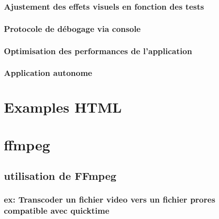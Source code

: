 \documentclass[
]{book}
\begin{document}
\hypertarget{ajustement-des-effets-visuels-en-fonction-des-tests}{%
\subsection{Ajustement des effets visuels en fonction des tests}\label{ajustement-des-effets-visuels-en-fonction-des-tests}}

\hypertarget{protocole-de-duxe9bogage-via-console}{%
\subsection{Protocole de débogage via console}\label{protocole-de-duxe9bogage-via-console}}

\hypertarget{optimisation-des-performances-de-lapplication}{%
\subsection{Optimisation des performances de l'application}\label{optimisation-des-performances-de-lapplication}}

\hypertarget{application-autonome}{%
\subsection{Application autonome}\label{application-autonome}}

\hypertarget{examples-html}{%
\chapter{Examples HTML}\label{examples-html}}

\hypertarget{ffmpeg}{%
\chapter{ffmpeg}\label{ffmpeg}}

\hypertarget{utilisation-de-ffmpeg}{%
\section{utilisation de FFmpeg}\label{utilisation-de-ffmpeg}}

\hypertarget{ex-transcoder-un-fichier-video-vers-un-fichier-prores-compatible-avec-quicktime}{%
\subsection{ex: Transcoder un fichier video vers un fichier prores compatible avec quicktime}\label{ex-transcoder-un-fichier-video-vers-un-fichier-prores-compatible-avec-quicktime}}
\end{document}
